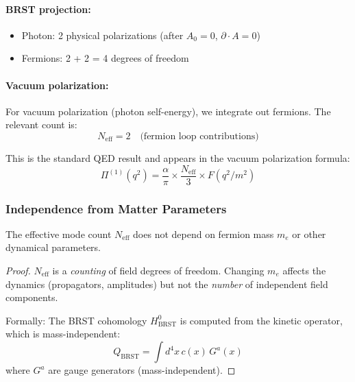 \paragraph{BRST projection:}
\begin{itemize}
    \item Photon: 2 physical polarizations (after \(A_0 = 0\), \(∂ \cdot A = 0\))
    \item Fermions: 2 + 2 = 4 degrees of freedom
\end{itemize}

\paragraph{Vacuum polarization:}
For vacuum polarization (photon self-energy), we integrate out fermions.
The relevant count is:
\begin{equation}
\label{eq:Neff-QED-explicit}
N_{\mathrm{eff}} = 2 \quad \text{(fermion loop contributions)}
\end{equation}

This is the standard QED result and appears in the vacuum polarization formula:
\begin{equation}
\label{eq:Pi-with-Neff}
\Pi^{(1)}(q^2) = \frac{\alpha}{\pi} \times \frac{N_{\mathrm{eff}}}{3} \times F(q^2/m^2)
\end{equation}

\subsubsection{Independence from Matter Parameters}

\begin{corollary}
\label{cor:Neff-mass-independent}
The effective mode count \(N_{\mathrm{eff}}\) does not depend on fermion mass \(m_e\)
or other dynamical parameters.
\end{corollary}

\begin{proof}
\(N_{\mathrm{eff}}\) is a \emph{counting} of field degrees of freedom.
Changing \(m_e\) affects the dynamics (propagators, amplitudes) but not the
\emph{number} of independent field components.

Formally: The BRST cohomology \(H^0_{\text{BRST}}\) is computed from the
kinetic operator, which is mass-independent:
\[Q_{\text{BRST}} = \int d^4x \, c(x) \, G^a(x)\]
where \(G^a\) are gauge generators (mass-independent).
\end{proof}

